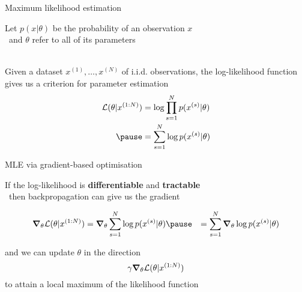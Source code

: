 \documentclass[14pt]{beamer}
\begin{document}
\begin{frame}{Maximum likelihood estimation}

Let $p(x|\theta)$ be the probability of an observation $x$\\
~and $\theta$ refer to all of its parameters \\

~ \pause

Given a dataset $x^{(1)}, \ldots, x^{(N)}$ of i.i.d. observations, \pause
the log-likelihood function gives us a criterion for parameter estimation
\begin{equation*}
\begin{aligned}
\mathcal L(\theta|x^{(1:N)}) &= \log \prod_{s=1}^N p(x^{(s)}|\theta) \\ \pause
 &= \sum_{s=1}^N \log p(x^{(s)}|\theta)
\end{aligned}
\end{equation*} 


\end{frame}

\begin{frame}{MLE via gradient-based optimisation}

If the log-likelihood is {\bf differentiable} and  {\bf tractable}\\
~then backpropagation can give us the gradient
\begin{small}
\begin{equation*}
\begin{aligned}
\grad_\theta \mathcal L(\theta|x^{(1:N)}) &= \grad_\theta \sum_{s=1}^N \log p(x^{(s)}|\theta) \pause
 &=  \sum_{s=1}^N \grad_\theta \log p(x^{(s)}|\theta)
\end{aligned}
\end{equation*}
\end{small}  \pause

and we can update $\theta$ in the direction
\begin{equation*}
\gamma \grad_\theta \mathcal L(\theta|x^{(1:N)})
\end{equation*}
to attain a local maximum of the likelihood function

\end{frame}
\end{document}
